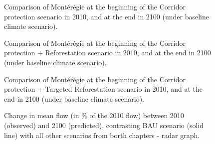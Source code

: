 \begin{figure}[h!]
 \caption{Comparison of Montérégie at the beginning of the Corridor protection scenario in 2010, and at the end in 2100 (under baseline climate scenario).}
 \label{fig:Corr_compare}
\end{figure}

\begin{figure}[h!]
 \caption{Comparison of Montérégie at the beginning of the Corridor protection + Reforestation scenario in 2010, and at the end in 2100 (under baseline climate scenario).}
 \label{fig:	CorrRef_compare}
\end{figure}

\begin{figure}[h!]
 \caption{Comparison of Montérégie at the beginning of the Corridor protection + Targeted Reforestation scenario in 2010, and at the end in 2100 (under baseline climate scenario).}
 \label{fig:	CorrRefT_compare}
\end{figure}


\begin{figure}[h!]
 \caption{Change in mean flow (in \% of the 2010 flow) between 2010 (observed) and 2100 (predicted), contrasting BAU scenario (solid line) with all other scenarios from borth chapters - radar graph.}
 \label{fig:flow_radar_both}
\end{figure}